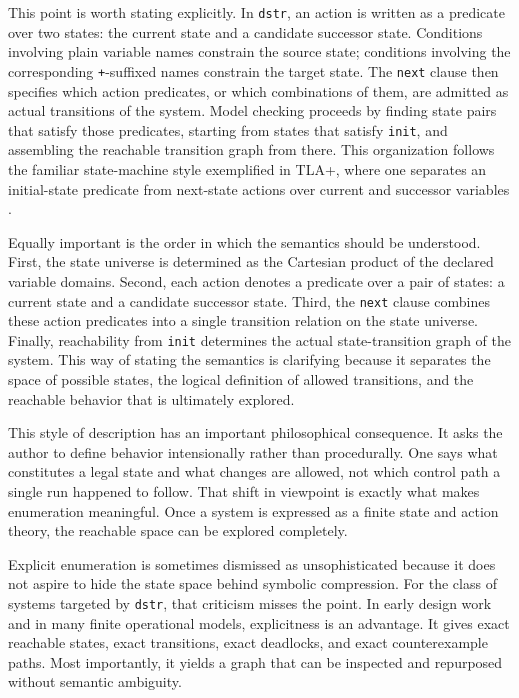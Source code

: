 \documentclass[11pt]{article}
\begin{document}
This point is worth stating explicitly. In \texttt{dstr}, an action is written
as a predicate over two states: the current state and a candidate successor
state. Conditions involving plain variable names constrain the source state;
conditions involving the corresponding \texttt{+}-suffixed names constrain the
target state. The \texttt{next} clause then specifies which action predicates,
or which combinations of them, are admitted as actual transitions of the
system. Model checking proceeds by finding state pairs that satisfy those
predicates, starting from states that satisfy \texttt{init}, and assembling the
reachable transition graph from there. This organization follows the familiar
state-machine style exemplified in TLA+, where one separates an initial-state
predicate from next-state actions over current and successor variables
\cite{DBLP:books/aw/Lamport2002}.

Equally important is the order in which the semantics should be understood.
First, the state universe is determined as the Cartesian product of the
declared variable domains. Second, each action denotes a predicate over a pair
of states: a current state and a candidate successor state. Third, the
\texttt{next} clause combines these action predicates into a single transition
relation on the state universe. Finally, reachability from \texttt{init}
determines the actual state-transition graph of the system. This way of stating
the semantics is clarifying because it separates the space of possible states,
the logical definition of allowed transitions, and the reachable behavior that
is ultimately explored.

This style of description has an important philosophical consequence. It asks
the author to define behavior intensionally rather than procedurally. One says
what constitutes a legal state and what changes are allowed, not which control
path a single run happened to follow. That shift in viewpoint is exactly what
makes enumeration meaningful. Once a system is expressed as a finite state and
action theory, the reachable space can be explored completely.

Explicit enumeration is sometimes dismissed as unsophisticated because it does
not aspire to hide the state space behind symbolic compression. For the class of
systems targeted by \texttt{dstr}, that criticism misses the point. In early
design work and in many finite operational models, explicitness is an advantage.
It gives exact reachable states, exact transitions, exact deadlocks, and exact
counterexample paths. Most importantly, it yields a graph that can be inspected
and repurposed without semantic ambiguity.
\end{document}
